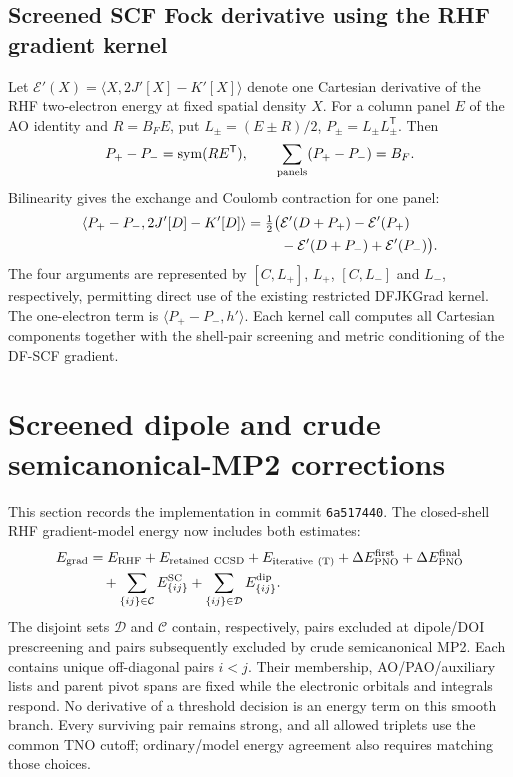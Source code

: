 \documentclass[11pt]{article}
\newcommand{\T}{^{\mathsf T}}
\newcommand{\sym}{\operatorname{sym}}
\begin{document}
\subsection{Screened SCF Fock derivative using the RHF gradient kernel}
Let $\mathcal E'(X)=\langle X,2J'[X]-K'[X]\rangle$ denote one Cartesian
derivative of the RHF two-electron energy at fixed spatial density $X$.
For a column panel $E$ of the AO identity and $R=B_F E$, put
$L_\pm=(E\pm R)/2$, $P_\pm=L_\pm L_\pm\T$. Then
\begin{equation}
 P_+-P_-=\sym(RE\T),\qquad \sum_{\rm panels}(P_+-P_-)=B_F.
\end{equation}
Bilinearity gives the exchange and Coulomb contraction for one panel:
\begin{align}
 \langle P_+-P_-,2J'[D]-K'[D]\rangle
 =\tfrac12\big(&\mathcal E'(D+P_+)-\mathcal E'(P_+)\notag\\
 &-\mathcal E'(D+P_-)+\mathcal E'(P_-)\big).
\end{align}
The four arguments are represented by $[C,L_+]$, $L_+$, $[C,L_-]$ and
$L_-$, respectively, permitting direct use of the existing restricted
DFJKGrad kernel. The one-electron term is
$\langle P_+-P_-,h'\rangle$. Each kernel call computes all Cartesian
components together with the shell-pair screening and metric conditioning
of the DF-SCF gradient.
\section{Screened dipole and crude semicanonical-MP2 corrections}
\label{sec:screened-gradient}
This section records the implementation in commit \texttt{6a517440}.
The closed-shell RHF gradient-model energy now includes both estimates:
\begin{align}
 E_{\rm grad}&=E_{\rm RHF}+E_{\rm retained\ CCSD}+E_{\rm iterative\ (T)}
 +\Delta E_{\rm PNO}^{\rm first}+\Delta E_{\rm PNO}^{\rm final}\notag\\
 &\quad+\sum_{\{ij\}\in\mathcal C}E_{\{ij\}}^{\rm SC}
       +\sum_{\{ij\}\in\mathcal D}E_{\{ij\}}^{\rm dip}.
 \label{eq:gradient-screened-functional}
\end{align}
The disjoint sets $\mathcal D$ and $\mathcal C$ contain, respectively,
pairs excluded at dipole/DOI prescreening and pairs subsequently excluded
by crude semicanonical MP2. Each contains unique off-diagonal pairs $i<j$.
Their membership, AO/PAO/auxiliary lists and parent pivot spans are fixed
while the electronic orbitals and integrals respond. No derivative of a
threshold decision is an energy term on this smooth branch. Every surviving
pair remains strong, and all allowed triplets use the common TNO cutoff;
ordinary/model energy agreement also requires matching those choices.
\end{document}
